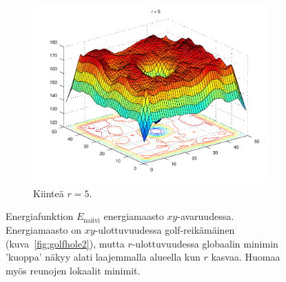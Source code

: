\begin{figure}[p]
    \begin{subfigure}[b]{0.7\textwidth}
            \includegraphics[width=\textwidth]{figures/golfhole3.pdf}
        \caption{Kiinteä $r=5$.
            \label{fig:golfhole3}
        }
    \end{subfigure}
    \caption{Energiafunktion $E_\text{naiivi}$ energiamaasto $xy$-avaruudessa.
        Energiamaasto on $xy$-ulottuvuudessa golf-reikämäinen (kuva~\ref{fig:golfhole2}), mutta $r$-ulottuvuudessa globaalin minimin 'kuoppa' näkyy alati laajemmalla alueella kun $r$ kasvaa.
        Huomaa myös reunojen lokaalit minimit.
        \label{fig:golfholes}}
\end{figure}



